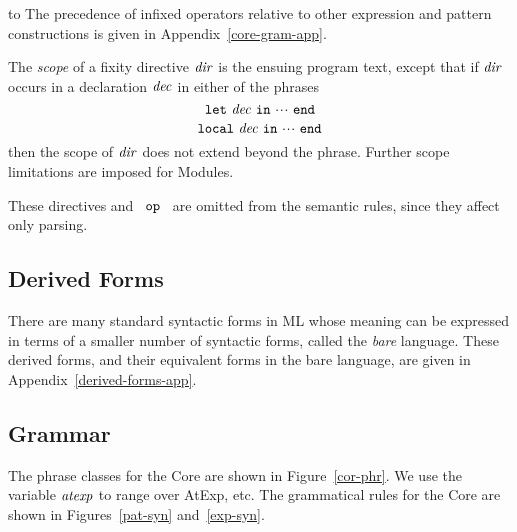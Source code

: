 \halign to
\medskip
The precedence of infixed operators relative
to other expression and pattern constructions is given in
Appendix~\ref{core-gram-app}.

The {\sl scope} of a fixity directive ${\it dir}$ is the ensuing program text,
except that if ${\it dir}$ occurs in a declaration ${\it dec}$ in either of the phrases
\[ {\tt let}\ {\it dec}\ {\tt in}\ \mbox{$\cdot\!\cdot\!\cdot$}\ {\tt end} \]
\[ {\tt local}\ {\it dec}\ {\tt in}\ \mbox{$\cdot\!\cdot\!\cdot$}\ {\tt end} \]
then the scope of ${\it dir}$ does not extend beyond the phrase. Further scope
limitations are imposed for Modules.

These directives and ~${\tt op}$~ are omitted from the semantic rules, since they
affect only parsing.

\subsection{Derived Forms}
\label{cor-der-form-sec}
There are many standard syntactic forms in ML whose meaning can be expressed
in terms of a smaller number of syntactic forms, called the {\sl bare} language.
These derived forms, and their equivalent forms in the bare language, are
given in
Appendix~\ref{derived-forms-app}.



\subsection{Grammar}

The phrase classes for the Core are shown in Figure~\ref{cor-phr}.
We use the variable ${\it atexp}$ to range over AtExp, etc.
The grammatical rules for the Core are shown in Figures~\ref{pat-syn} and~\ref{exp-syn}.


